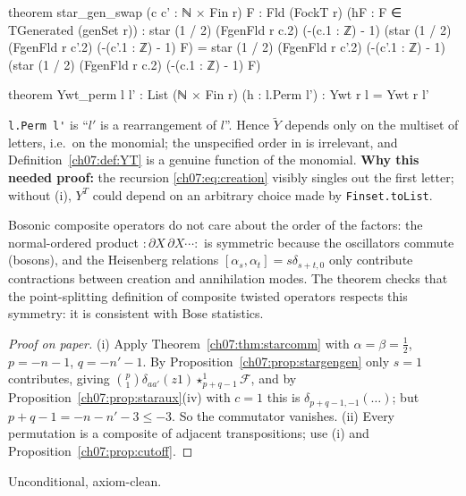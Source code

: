 \begin{leancode}
theorem star_gen_swap (c c' : ℕ × Fin r) {F : Fld (FockT r)} (hF : F ∈ TGenerated (genSet r)) :
    star (1 / 2) (FgenFld r c.2) (-(c.1 : ℤ) - 1)
        (star (1 / 2) (FgenFld r c'.2) (-(c'.1 : ℤ) - 1) F)
      = star (1 / 2) (FgenFld r c'.2) (-(c'.1 : ℤ) - 1)
          (star (1 / 2) (FgenFld r c.2) (-(c.1 : ℤ) - 1) F)

theorem Ywt_perm {l l' : List (ℕ × Fin r)} (h : l.Perm l') : Ywt r l = Ywt r l'
\end{leancode}

\begin{dictionary}
\verb|l.Perm l'| is ``$l'$ is a rearrangement of $l$''. Hence $\widetilde Y$ depends only on the
multiset of letters, i.e.\ on the monomial; the unspecified order in  is
irrelevant, and Definition~\ref{ch07:def:YT} is a genuine function of the monomial.
\textbf{Why this needed proof:} the recursion \eqref{ch07:eq:creation} visibly singles out the
first letter; without (i), $Y^T$ could depend on an arbitrary choice made by \verb|Finset.toList|.
\end{dictionary}

\begin{physics}
Bosonic composite operators do not care about the order of the factors: the normal-ordered product ${:}\partial X\,\partial X\cdots{:}$ is symmetric because the oscillators commute (bosons), and the Heisenberg relations $[\alpha_s,\alpha_t]=s\delta_{s+t,0}$ only contribute contractions between creation and annihilation modes. The theorem checks that the point-splitting definition of composite twisted operators respects this symmetry: it is consistent with Bose statistics.
\end{physics}

\begin{proof}[Proof on paper]
(i) Apply Theorem~\ref{ch07:thm:starcomm} with $\alpha=\beta=\frac12$, $p = -n-1$, $q=-n'-1$.
By Proposition~\ref{ch07:prop:stargengen} only $s = 1$ contributes, giving
$\binom p1\delta_{aa'}(z1)\star^1_{p+q-1}\mathcal F$, and by
Proposition~\ref{ch07:prop:staraux}(iv) with $c=1$ this is $\delta_{p+q-1,-1}(\ldots)$; but
$p+q-1 = -n-n'-3\le-3$. So the commutator vanishes. (ii) Every permutation is a composite of
adjacent transpositions; use (i) and Proposition~\ref{ch07:prop:cutoff}.
\end{proof}

\begin{status}
Unconditional, axiom-clean.
\end{status}

